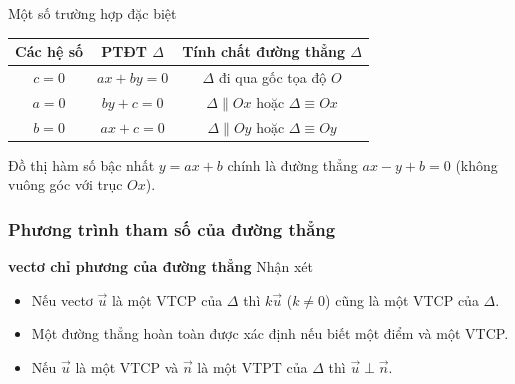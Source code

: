  Một số trường hợp đặc biệt
	\begin{center}
		\renewcommand{\arraystretch}{2}%
		\begin{tabular}{|c|c|c|}
			\hline 
			Các hệ số & PTĐT $\Delta$ & Tính chất đường thẳng $\Delta$ \\ 
			\hline 
			$c=0$ & $ax+by =0$ & $\Delta$ đi qua gốc tọa độ $O$ \\ 
			\hline 
			$a=0$ & $by+c=0$ & $\Delta \parallel Ox$ hoặc $\Delta  \equiv Ox$ \\ 
			\hline 
			$b=0$ & $ax+c=0$ &  $\Delta \parallel Oy$ hoặc $\Delta  \equiv Oy$ \\ 
			\hline 
		\end{tabular} 
	\end{center}


\begin{note}
	Đồ thị hàm số bậc nhất $y=ax+b$ chính là đường thẳng $ax-y+b=0$ (không vuông góc với trục $Ox$).
\end{note}

\subsubsection{Phương trình tham số của đường thẳng}
\textbf{vectơ chỉ phương của đường thẳng}
		Nhận xét 
		\begin{itemize}
			\item Nếu vectơ $\overrightarrow{u}$  là một VTCP của $\Delta$ thì $k \overrightarrow{u}$ ($k \ne 0 $) cũng là một VTCP của $\Delta$. 
			\item Một đường thẳng hoàn toàn được xác định nếu biết một điểm và một VTCP.
			\item Nếu $\overrightarrow{u}$ là một VTCP và $\overrightarrow{n}$ là một VTPT của $\Delta$ thì $\overrightarrow{u} \perp \overrightarrow{n}$.
		\end{itemize}
		
